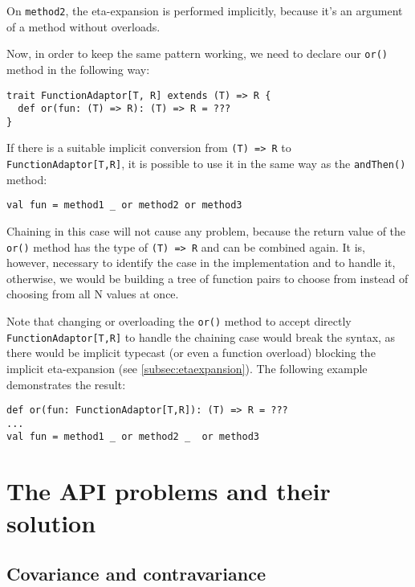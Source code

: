 On \lstinline|method2|, the eta-expansion is performed implicitly, because it's an argument of a method without overloads.

Now, in order to keep the same pattern working, we need to declare our \lstinline|or()| method in the following way:
\lstset{style=Scala}
\begin{lstlisting}
trait FunctionAdaptor[T, R] extends (T) => R {
  def or(fun: (T) => R): (T) => R = ???
}
\end{lstlisting}

If there is a suitable implicit conversion from \lstinline|(T) => R| to \lstinline|FunctionAdaptor[T,R]|, it is possible to use it in the same way as the \lstinline|andThen()| method:

\lstset{style=Scala}
\begin{lstlisting}
val fun = method1 _ or method2 or method3
\end{lstlisting}

Chaining in this case will not cause any problem, because the return value of the \lstinline|or()| method has the type of \lstinline|(T) => R| and can be combined again. It is, however, necessary to identify the case in the implementation and to handle it, otherwise, we would be building a tree of function pairs to choose from instead of choosing from all N values at once.

Note that changing or overloading the \lstinline|or()| method to accept directly \lstinline|FunctionAdaptor[T,R]| to handle the chaining case would break the syntax, as there would be implicit typecast (or even a function overload) blocking the implicit eta-expansion (see \ref{subsec:etaexpansion}). The following example demonstrates the result:

\lstset{style=Scala}
\begin{lstlisting}
def or(fun: FunctionAdaptor[T,R]): (T) => R = ???
...
val fun = method1 _ or method2 _  or method3
\end{lstlisting}


\section{The API problems and their solution}

\subsection{Covariance and contravariance}

